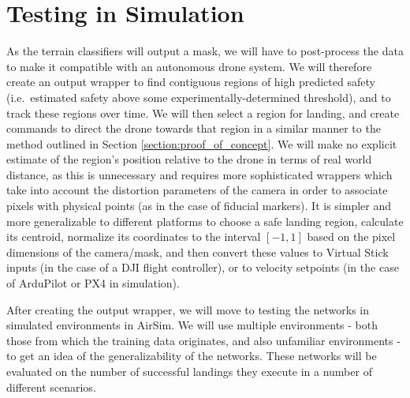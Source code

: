 \section{Testing in Simulation}

As the terrain classifiers will output a mask, we will have to post-process the data
to make it compatible with an autonomous drone system.
We will therefore create an output wrapper
to find contiguous regions of high predicted safety (i.e.~estimated safety above
some experimentally-determined threshold),
and to track these regions over time.
We will then select a region for landing, and create commands to direct the drone
towards that region in a similar manner to the method outlined in Section \ref{section:proof_of_concept}.
We will make no explicit estimate of the region's position relative to the drone in terms
of real world distance,
as this is unnecessary and requires more sophisticated wrappers which take into account the distortion
parameters of the camera in order to associate pixels with physical points (as in the case of fiducial markers).
It is simpler and more generalizable to different platforms to choose a safe landing region,
calculate its centroid, normalize its coordinates to the interval $[-1,1]$
based on the pixel dimensions of the camera/mask,
and then convert these values to Virtual Stick inputs (in the case of a DJI flight controller),
or to velocity setpoints (in the case of ArduPilot or PX4 in simulation).

After creating the output wrapper, we will move to testing the networks in simulated environments
in AirSim.
We will use multiple environments - both those from which the training data originates,
and also unfamiliar environments - to get an idea of the generalizability of the networks.
These networks will be evaluated on the number of successful landings they execute in a number
of different scenarios.
